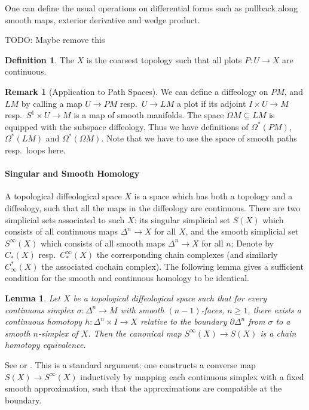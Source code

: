 \documentclass{scrartcl}
\let\emph\relax
\theoremstyle{plain}
\newtheorem{lemma}[theorem]{Lemma}
\theoremstyle{definition}
\newtheorem{definition}[theorem]{Definition}
\newtheorem{remark}[theorem]{Remark}
\renewcommand{\subset}{\subseteq}
\begin{document}
One can define the usual operations on differential forms such as pullback along smooth maps, exterior derivative and wedge product.

TODO: Maybe remove this
\begin{definition}
    The \emph{topology of a diffeological space} $X$ is the coarsest topology such that all plots $P\colon U\to X$ are continuous. 
\end{definition}

\begin{remark}[Application to Path Spaces] We can define a diffeology on $PM$, and $LM$ by calling a map $U\to PM$ resp.\ $U\to LM$ a plot if its adjoint $I\times U\to M$ resp.\ $S^1\times U\to M$ is a map of smooth manifolds. The space $\Omega M\subset LM$ is equipped with the subspace diffeology. Thus we have definitions of $\Omega^*(PM)$, $\Omega^*(LM)$ and $\Omega^*(\Omega M)$. Note that we have to use the space of smooth paths resp.\ loops here. 
\end{remark}

\paragraph{Singular and Smooth Homology} A topological diffeological space $X$ is a space which has both a topology and a diffeology, such that all the maps in the diffeology are continuous. There are two simplicial sets associated to such $X$: its singular simplicial set $S(X)$ which consists of all continuous maps $\Delta^n\to X$ for all $X$, and the smooth simplicial set $S^\infty(X)$ which consists of all smooth maps $\Delta^n\to X$ for all $n$; Denote by $C_*(X)$ resp.\ $C_*^\infty(X)$ the corresponding chain complexes (and similarly $C^*_\infty(X)$ the associated cochain complex). The following lemma gives a sufficient condition for the smooth and continuous homology to be identical.
\begin{lemma}
    Let $X$ be a topological diffeological space such that for every continuous simplex $\sigma\colon \Delta^n\to M$ with smooth $(n-1)$-faces, $n\geq 1$, there exists a continuous homotopy $h\colon \Delta^n\times I\to X$ relative to the boundary $\partial\Delta^n$ from $\sigma$ to a smooth $n$-simplex of $X$. Then the canonical map $S^\infty(X) \to S(X)$ is a chain homotopy equivalence. 
\end{lemma}
See \cite{chen1977iterated} or \cite{parkproof}. This is a standard argument: one constructs a converse map $S(X)\to S^\infty(X)$ inductively by mapping each continuous simplex with a fixed smooth approximation, such that the approximations are compatible at the boundary. 
\end{document}

